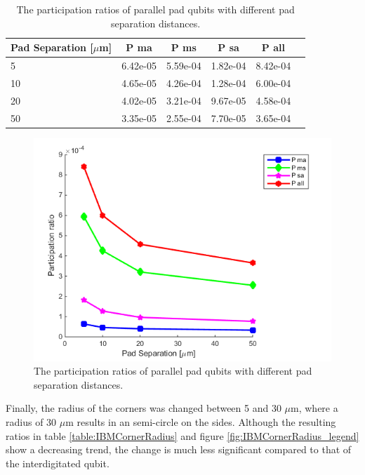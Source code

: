  \begin{table}
 	\begin{center}
 		\begin{tabular}{ | l || c | c | c | c | c |}
 			\hline
 			Pad Separation [\(\mu\)m] & P ma & P ms & P sa & P all \\ \hline
 			5 & 6.42e-05 & 5.59e-04 & 1.82e-04 & 8.42e-04 \\
 			10 & 4.65e-05 & 4.26e-04 & 1.28e-04 & 6.00e-04 \\
 			20 & 4.02e-05 & 3.21e-04 & 9.67e-05 & 4.58e-04 \\
 			50 & 3.35e-05 & 2.55e-04 & 7.70e-05 & 3.65e-04 \\
 			\hline
 		\end{tabular}
 	\end{center}
 	\caption{The participation ratios of parallel pad qubits with different pad separation distances.}
 	\label{table:IBMPadSep}
 \end{table}
 
 \begin{figure}
 	\centering
 	\includegraphics[scale = 0.7]{Figures/Ratio_plots/IBMPadSep_legend}
 	\caption{The participation ratios of parallel pad qubits with different pad separation distances.}
 	\label{fig:IBMPadSep_legend}
 \end{figure}
 
 Finally, the radius of the corners was changed between 5 and 30 \(\mu\)m, where a radius of 30 \(\mu\)m results in an semi-circle on the sides. Although the resulting ratios in table \ref{table:IBMCornerRadius} and figure \ref{fig:IBMCornerRadius_legend} show a decreasing trend, the change is much less significant compared to that of the interdigitated qubit.
 

